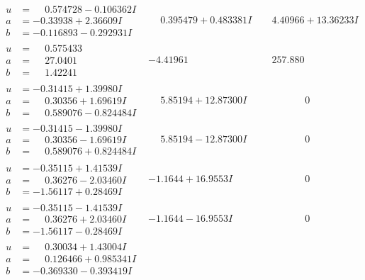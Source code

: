 \documentclass[1p]{elsarticle_modified}
\theoremstyle{definition}
\begin{document}
$$\begin{array}{c|c|c}
\begin{aligned}
u &= \phantom{-}0.574728 - 0.106362 I \\
a &= -0.33938 + 2.36609 I \\
b &= -0.116893 - 0.292931 I\end{aligned}
 & \phantom{-}0.395479 + 0.483381 I & \phantom{-}4.40966 + 13.36233 I \\ \hline\begin{aligned}
u &= \phantom{-}0.575433\phantom{ +0.000000I} \\
a &= \phantom{-}27.0401\phantom{ +0.000000I} \\
b &= \phantom{-}1.42241\phantom{ +0.000000I}\end{aligned}
 & -4.41961\phantom{ +0.000000I} & \phantom{-}257.880\phantom{ +0.000000I} \\ \hline\begin{aligned}
u &= -0.31415 + 1.39980 I \\
a &= \phantom{-}0.30356 + 1.69619 I \\
b &= \phantom{-}0.589076 - 0.824484 I\end{aligned}
 & \phantom{-}5.85194 + 12.87300 I & \phantom{-0.000000 } 0 \\ \hline\begin{aligned}
u &= -0.31415 - 1.39980 I \\
a &= \phantom{-}0.30356 - 1.69619 I \\
b &= \phantom{-}0.589076 + 0.824484 I\end{aligned}
 & \phantom{-}5.85194 - 12.87300 I & \phantom{-0.000000 } 0 \\ \hline\begin{aligned}
u &= -0.35115 + 1.41539 I \\
a &= \phantom{-}0.36276 - 2.03460 I \\
b &= -1.56117 + 0.28469 I\end{aligned}
 & -1.1644 + 16.9553 I & \phantom{-0.000000 } 0 \\ \hline\begin{aligned}
u &= -0.35115 - 1.41539 I \\
a &= \phantom{-}0.36276 + 2.03460 I \\
b &= -1.56117 - 0.28469 I\end{aligned}
 & -1.1644 - 16.9553 I & \phantom{-0.000000 } 0 \\ \hline\begin{aligned}
u &= \phantom{-}0.30034 + 1.43004 I \\
a &= \phantom{-}0.126466 + 0.985341 I \\
b &= -0.369330 - 0.393419 I\end{aligned}

\end{array}$$
\end{document}
